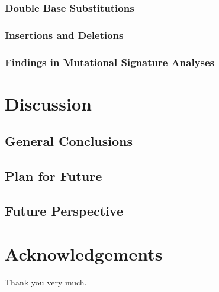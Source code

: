 \documentclass[11pt,a4paper,onecolumn,oneside]{report}
\begin{document}
            \subsubsection{Double Base Substitutions}

            \subsubsection{Insertions and Deletions}

            \subsubsection{Findings in Mutational Signature Analyses}

    \newpage

    \section{Discussion}
        \subsection{General Conclusions}

        \subsection{Plan for Future}

        \subsection{Future Perspective}

    \newpage

    
    
    \newpage

    \section*{\hfill \Large Acknowledgements \hfill}
        Thank you very much.
    \newpage

    \hbox{}
    \thispagestyle{empty}
    \clearpage
\end{document}
